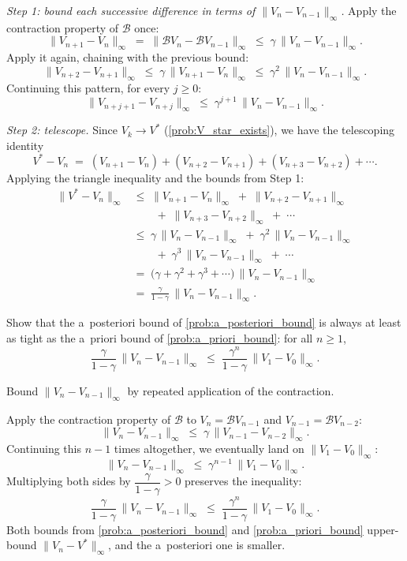 \documentclass[11pt]{article}
\begin{document}
\begin{solution}
\emph{Step 1: bound each successive difference in terms of $\|V_n - V_{n-1}\|_\infty$.} Apply the contraction property of $\mathcal{B}$ once:
$$
\|V_{n+1} - V_n\|_\infty \;=\; \|\mathcal{B} V_n - \mathcal{B} V_{n-1}\|_\infty \;\le\; \gamma\, \|V_n - V_{n-1}\|_\infty.
$$
Apply it again, chaining with the previous bound:
$$
\|V_{n+2} - V_{n+1}\|_\infty \;\le\; \gamma\, \|V_{n+1} - V_n\|_\infty \;\le\; \gamma^2\, \|V_n - V_{n-1}\|_\infty.
$$
Continuing this pattern, for every $j \ge 0$:
$$
\|V_{n+j+1} - V_{n+j}\|_\infty \;\le\; \gamma^{j+1}\, \|V_n - V_{n-1}\|_\infty.
$$

\emph{Step 2: telescope.} Since $V_k \to V^*$ (\cref{prob:V_star_exists}), we have the telescoping identity
$$
V^* - V_n \;=\; (V_{n+1} - V_n) + (V_{n+2} - V_{n+1}) + (V_{n+3} - V_{n+2}) + \cdots.
$$
Applying the triangle inequality and the bounds from Step 1:
\begin{align*}
\|V^* - V_n\|_\infty
&\le\; \|V_{n+1} - V_n\|_\infty \;+\; \|V_{n+2} - V_{n+1}\|_\infty \\
&\qquad +\; \|V_{n+3} - V_{n+2}\|_\infty \;+\; \cdots \\
&\le\; \gamma\, \|V_n - V_{n-1}\|_\infty \;+\; \gamma^2\, \|V_n - V_{n-1}\|_\infty \\
&\qquad +\; \gamma^3\, \|V_n - V_{n-1}\|_\infty \;+\; \cdots \\
&=\; \bigl(\gamma + \gamma^2 + \gamma^3 + \cdots\bigr)\, \|V_n - V_{n-1}\|_\infty \\
&=\; \frac{\gamma}{1-\gamma}\, \|V_n - V_{n-1}\|_\infty.
\end{align*}
\end{solution}

\begin{exercise}
\label{prob:a_posteriori_tighter} Show that the a~posteriori bound of \cref{prob:a_posteriori_bound} is always at least as tight as the a~priori bound of \cref{prob:a_priori_bound}: for all $n \ge 1$,
$$
\frac{\gamma}{1-\gamma}\, \|V_n - V_{n-1}\|_\infty \;\le\; \frac{\gamma^n}{1-\gamma}\, \|V_1 - V_0\|_\infty.
$$

\begin{hint}
Bound $\|V_n - V_{n-1}\|_\infty$ by repeated application of the contraction.
\end{hint}
\end{exercise}

\begin{solution}
Apply the contraction property of $\mathcal{B}$ to $V_n = \mathcal{B} V_{n-1}$ and $V_{n-1} = \mathcal{B} V_{n-2}$:
$$
\|V_n - V_{n-1}\|_\infty \;\le\; \gamma\, \|V_{n-1} - V_{n-2}\|_\infty.
$$
Continuing this $n-1$ times altogether, we eventually land on $\|V_1 - V_0\|_\infty$:
$$
\|V_n - V_{n-1}\|_\infty \;\le\; \gamma^{n-1}\, \|V_1 - V_0\|_\infty.
$$
Multiplying both sides by $\dfrac{\gamma}{1-\gamma} > 0$ preserves the inequality:
$$
\frac{\gamma}{1-\gamma}\, \|V_n - V_{n-1}\|_\infty \;\le\; \frac{\gamma^n}{1-\gamma}\, \|V_1 - V_0\|_\infty.
$$
Both bounds from \cref{prob:a_posteriori_bound} and \cref{prob:a_priori_bound} upper-bound $\|V_n - V^*\|_\infty$, and the a~posteriori one is smaller.
\end{solution}
\end{document}
